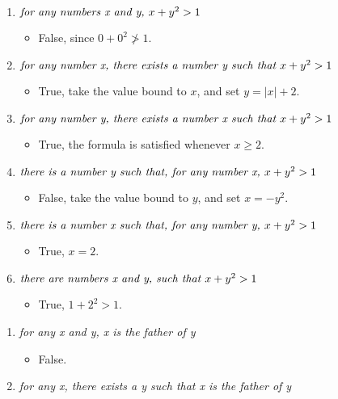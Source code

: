 \begin{enumerate}
  \begin{enumerate}
  \item $\emph{for any numbers x and y, } x + y^2 > 1$
    \begin{itemize}
    \item False, since $0 + 0^2 \ngtr 1$.
    \end{itemize}
  \item $\emph{for any number x, there exists a number y such that } x
    + y^2 > 1$
    \begin{itemize}
    \item True, take the value bound to $x$, and set $y = |x| + 2$.
    \end{itemize}
  \item $\emph{for any number y, there exists a number x such that } x
    + y^2 > 1$
    \begin{itemize}
    \item True, the formula is satisfied whenever $x \geq 2$.
    \end{itemize}
  \item $\emph{there is a number y such that, for any number x, } x +
    y^2 > 1$
    \begin{itemize}
    \item False, take the value bound to $y$, and set $x = - y^2$.
    \end{itemize}
  \item $\emph{there is a number x such that, for any number y, } x +
    y^2 > 1$
    \begin{itemize}
    \item True, $x = 2$.
    \end{itemize}
  \item $\emph{there are numbers x and y, such that } x + y^2 > 1$
    \begin{itemize}
    \item True, $1 + 2^2 > 1$.
    \end{itemize}
  \end{enumerate}
  \vspace{1em}
  \begin{enumerate}
  \item \emph{for any x and y, x is the father of y}
    \begin{itemize}
    \item False.
    \end{itemize}
  \item \emph{for any x, there exists a y such that x is the father of
      y}
    \begin{itemize}

\end{itemize}
\end{enumerate}
\end{enumerate}
